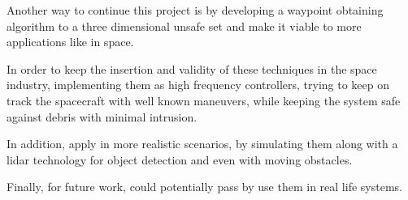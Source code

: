 Another way to continue this project is by developing a waypoint obtaining algorithm to a three dimensional unsafe set and make it viable to more applications like in space. 

In order to keep the insertion and validity of these techniques in the space industry, implementing them as high frequency controllers, trying to keep on track the spacecraft with well known maneuvers, while keeping the system safe against debris with minimal intrusion.  

In addition, apply in more realistic scenarios, by simulating them along with a lidar technology for object detection and even with moving obstacles.

Finally, for future work, could potentially pass by use them in real life systems. 